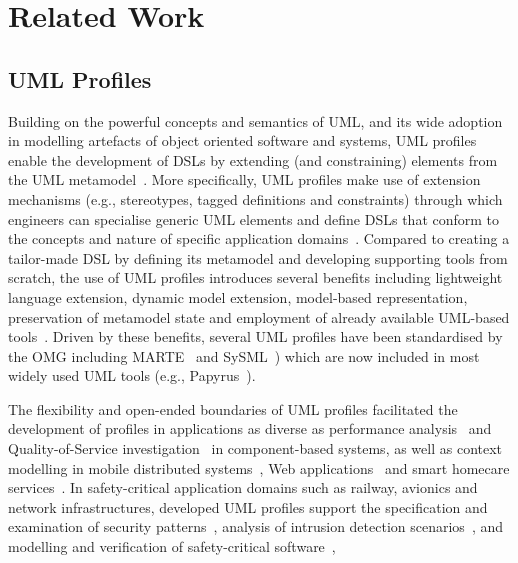 \section{Related Work} 
\label{sec:related}

\subsection{UML Profiles}
Building on the powerful concepts and semantics of UML, and its wide adoption in modelling artefacts of object oriented software and systems, UML profiles enable the development of DSLs by extending (and constraining) elements from the UML metamodel~\cite{FuentesFernandez2004:UMLME}. 
More specifically, UML profiles make use of extension mechanisms (e.g., stereotypes, tagged definitions and constraints) through which engineers can 
specialise generic UML elements and define DSLs that conform to the concepts and nature of specific application domains~\cite{Selic2007:ISORC}. 
Compared to creating a tailor-made DSL by defining its metamodel and developing supporting tools from scratch, the use of UML profiles introduces several benefits including lightweight language extension, dynamic model extension, model-based representation, preservation of metamodel state and employment of already available UML-based tools~\cite{langer2011uml}. 
Driven by these benefits, several UML profiles have been standardised by the OMG including MARTE~\cite{omg2011marte} and SySML~\cite{friedenthal2014practical}) which are now included in most widely used UML tools (e.g., Papyrus~\cite{lanusse2009papyrus}). 

The flexibility and open-ended boundaries of UML profiles facilitated the development of profiles in applications as diverse as performance analysis~\cite{xu2003performance} and Quality-of-Service investigation~\cite{cortellessa2004towards} in component-based systems, as well as context modelling in mobile distributed systems~\cite{Simons2007:JVLC},  Web applications~\cite{Moreno2007:IETS} and smart homecare services~\cite{Walderhaug2009:MODELS}. In safety-critical application domains
such as railway, avionics and network infrastructures, developed UML profiles support the specification and examination of security patterns~\cite{Bouaziz2012:ICCSE,Rodriguez2010:SERENE}, analysis of intrusion detection scenarios~\cite{hussein2006umlintr}, and modelling and verification of safety-critical software~\cite{Bernardi2013:JRESS,zoughbi2007uml}, 

